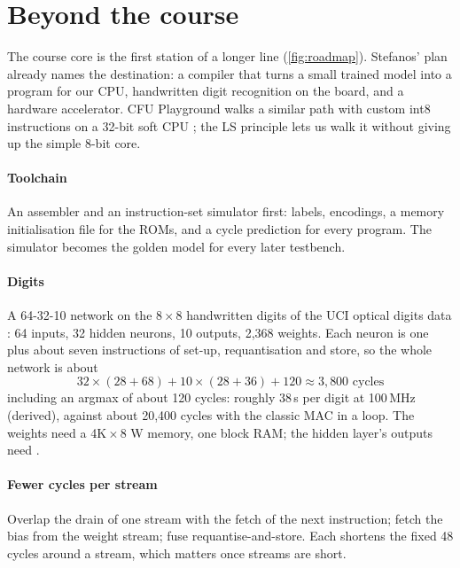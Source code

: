 \section{Beyond the course}\label{sec:future}


The course core is the first station of a longer line (\cref{fig:roadmap}). Stefanos' plan already names the destination: a compiler that turns a small trained model into a program for our CPU, handwritten digit recognition on the board, and a hardware accelerator. CFU Playground walks a similar path with custom int8 instructions on a 32-bit soft CPU \citep{prakash2023cfu}; the LS principle lets us walk it without giving up the simple 8-bit core.

\paragraph{Toolchain} An assembler and an instruction-set simulator first: labels, encodings, a memory initialisation file for the ROMs, and a cycle prediction for every program. The simulator becomes the golden model for every later testbench.

\paragraph{Digits} A 64-32-10 network on the 8\,$\times$\,8 handwritten digits of the UCI optical digits data \citep{alpaydin1998optdigits}: 64 inputs, 32 hidden neurons, 10 outputs, 2,368 weights. Each neuron is one  plus about seven instructions of set-up, requantisation and store, so the whole network is about
\[
32 \times (28 + 68) + 10 \times (28 + 36) + 120 \approx 3{,}800 \text{ cycles}
\]
including an argmax of about 120 cycles: roughly 38\,\textmu s per digit at 100\,MHz (derived), against about 20,400 cycles with the classic MAC in a loop. The weights need a 4K\,$\times$\,8 W memory, one block RAM; the hidden layer's outputs need .

\paragraph{Fewer cycles per stream} Overlap the drain of one stream with the fetch of the next instruction; fetch the bias from the weight stream; fuse requantise-and-store. Each shortens the fixed 48 cycles around a stream, which matters once streams are short.


